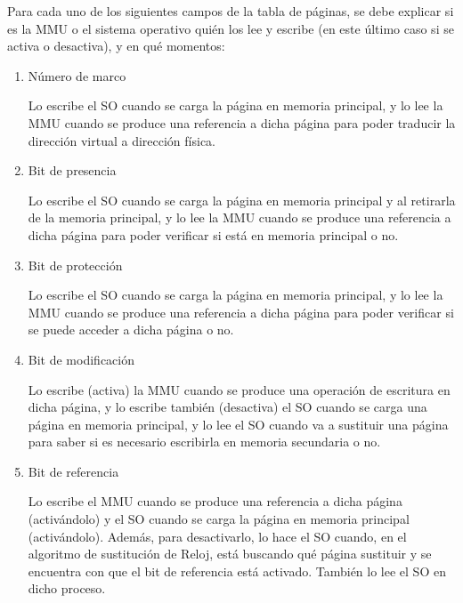 \begin{ejercicio}
Para cada uno de los siguientes campos de la tabla de páginas, se debe explicar si es la MMU o el sistema operativo quién los lee y escribe (en este último caso si se activa o desactiva), y en qué momentos:
\begin{enumerate}
    \item Número de marco
    
    Lo escribe el SO cuando se carga la página en memoria principal,
    y lo lee la MMU cuando se produce una referencia a dicha página para poder
    traducir la dirección virtual a dirección física.

    \item Bit de presencia
    
    Lo escribe el SO cuando se carga la página en memoria principal y al
    retirarla de la memoria principal,
    y lo lee la MMU cuando se produce una referencia a dicha página para poder
    verificar si está en memoria principal o no.

    \item Bit de protección
    
    Lo escribe el SO cuando se carga la página en memoria principal,
    y lo lee la MMU cuando se produce una referencia a dicha página para poder
    verificar si se puede acceder a dicha página o no.

    \item Bit de modificación
    
    Lo escribe (activa) la MMU cuando se produce una operación de escritura en dicha página,
    y lo escribe también (desactiva) el SO cuando se carga una página en memoria principal,
    y lo lee el SO cuando va a sustituir una página para saber si es necesario escribirla en memoria secundaria o no.
    
    \item Bit de referencia
    
    Lo escribe el MMU cuando se produce una referencia a dicha página (activándolo) y el
    SO cuando se carga la página en memoria principal (activándolo). Además, para desactivarlo,
    lo hace el SO cuando, en el algoritmo de sustitución de Reloj,
    está buscando qué página sustituir y se encuentra con que el bit de referencia está activado.
    También lo lee el SO en dicho proceso.
\end{enumerate}
\end{ejercicio}

